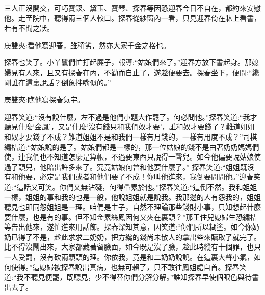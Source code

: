 \begin{parag}
    三人正沒開交，可巧寶釵、黛玉、寶琴、探春等因恐迎春今日不自在，都約來安慰他。走至院中，聽得兩三個人較口。探春從紗窗內一看，只見迎春倚在牀上看書，若有不聞之狀。\begin{note}庚雙夾:看他寫迎春，雖稍劣，然亦大家千金之格也。\end{note}探春也笑了。小丫鬟們忙打起簾子，報導:“姑娘們來了。”迎春方放下書起身。那媳婦見有人來，且又有探春在內，不勸而自止了，遂趁便要去。探春坐下，便問:“纔剛誰在這裏說話？倒象拌嘴似的。”\begin{note}庚雙夾:瞧他寫探春氣宇。\end{note}迎春笑道:“沒有說什麼，左不過是他們小題大作罷了。何必問他。”探春笑道:“我才聽見什麼‘金鳳’，又是什麼‘沒有錢只和我們奴才要’，誰和奴才要錢了？難道姐姐和奴才要錢了不成？難道姐姐不是和我們一樣有月錢的，一樣有用度不成？”司棋繡桔道:“姑娘說的是了。姑娘們都是一樣的，那一位姑娘的錢不是由著奶奶媽媽們使，連我們也不知道怎麼是算帳，不過要東西只說得一聲兒。如今他偏要說姑娘使過了頭兒，他賠出許多來了。究竟姑娘何曾和他要什麼了。” 探春笑道:“姐姐既沒有和他要，必定是我們或者和他們要了不成！你叫他進來，我倒要問問他。”迎春笑道:“這話又可笑。你們又無沾礙，何得帶累於他。”探春笑道:“這倒不然。我和姐姐一樣，姐姐的事和我的也是一般，他說姐姐就是說我。我那邊的人有怨我的，姐姐聽見也即同怨姐姐是一理。咱們是主子，自然不理論那些錢財小事，只知想起什麼要什麼，也是有的事。但不知金累絲鳳因何又夾在裏頭？”那王住兒媳婦生恐繡桔等告出他來，遂忙進來用話飾。探春深知其意，因笑道:“你們所以糊塗。如今你奶奶已得了不是，趁此求求二奶奶，把方纔的錢尚未散人的拿出些來贖取了就完了。比不得沒鬧出來，大家都藏著留臉面，如今既是沒了臉，趁此時縱有十個罪，也只一人受罰，沒有砍兩顆頭的理。你依我，竟是和二奶奶說說。在這裏大聲小氣，如何使得。”這媳婦被探春說出真病，也無可賴了，只不敢往鳳姐處自首。探春笑道:“我不聽見便罷，既聽見，少不得替你們分解分解。”誰知探春早使個眼色與待書出去了。
\end{parag}


